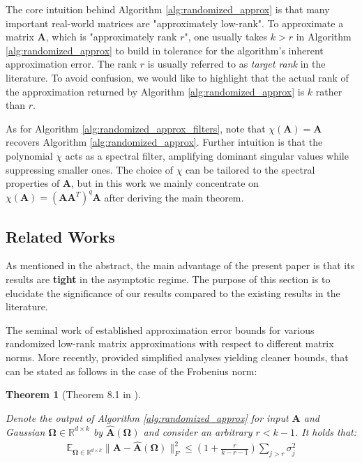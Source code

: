 \documentclass[conference]{IEEEtran}
\newcommand{\bOmega}{\bm{\Omega}}
\newcommand{\bA}{\mathbf{A}}
\newcommand{\bbE}{\mathbb{E}}
\newcommand{\bbR}{\mathbb{R}}
\newtheorem{theorem}{Theorem}
\begin{document}
The core intuition behind Algorithm \ref{alg:randomized_approx} is that many important real-world matrices are "approximately low-rank". To approximate a matrix $\bA$, which is "approximately rank $r$", one usually takes $k > r$ in Algorithm \ref{alg:randomized_approx} to build in tolerance for the algorithm's inherent approximation error. The rank $r$ is usually referred to as {\it target rank} in the literature. To avoid confusion, we would like to highlight that the actual rank of the approximation returned by Algorithm \ref{alg:randomized_approx} is $k$ rather than $r$. 


As for Algorithm \ref{alg:randomized_approx_filters}, note that $\chi(\bA) = \bA$ recovers Algorithm \ref{alg:randomized_approx}. Further intuition is that the polynomial $\chi$ acts as a spectral filter, amplifying dominant singular values while suppressing smaller ones. The choice of $\chi$ can be tailored to the spectral properties of $\mathbf{A}$, but in this work we mainly concentrate on $\chi(\bA)= (\mathbf{A}\mathbf{A}^T)^q\mathbf{A}$ after deriving the main theorem. 



\subsection{Related Works}

As mentioned in the abstract, the main advantage of the present paper is that its results are {\bf tight} in the asymptotic regime. The purpose of this section is to elucidate the significance of our results compared to the existing results in the literature.

The seminal work of \cite{halko2011finding} established approximation error bounds for various randomized low-rank matrix approximations with respect to different matrix norms. More recently, \cite{tropp2023randomized} provided simplified analyses yielding cleaner bounds, that can be stated as follows in the case of the Frobenius norm:

\begin{theorem}[Theorem 8.1 in \cite{tropp2023randomized}]\label{thm: halko_bound}
    
Denote the output of Algorithm \ref{alg:randomized_approx} for input $\bA$ and Gaussian $\bOmega \in \bbR^{d \times k}$ by $\hat{\bA}(\bOmega)$  and consider an arbitrary $r < k - 1$. It holds that:
\begin{align*}
\bbE_{\bOmega \in \bbR^{d \times k}} \|\bA - \hat{\bA}(\bOmega)\|_F^2\leq \left(1 + \frac{r}{k-r-1}\right) \sum_{j>r} \sigma_j^2
\end{align*}

\end{theorem}
\end{document}
